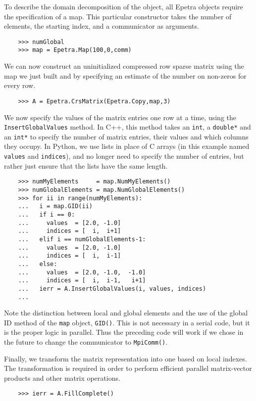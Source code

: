 \documentclass[10pt,relax]{SANDreport}
\begin{document}
To describe the domain decomposition of the object, all Epetra objects
require the specification of a map.  This particular constructor takes
the number of elements, the starting index, and a communicator as
arguments.
\begin{verbatim}
    >>> numGlobal
    >>> map = Epetra.Map(100,0,comm)
\end{verbatim}

We can now construct an uninitialized compressed row sparse matrix
using the map we just built and by specifying an estimate of the
number on non-zeros for every row.
\begin{verbatim}
    >>> A = Epetra.CrsMatrix(Epetra.Copy,map,3)
\end{verbatim}

We now specify the values of the matrix entries one row at a time,
using the {\tt InsertGlobalValues} method.  In C++, this method takes
an {\tt int}, a {\tt double*} and an {\tt int*} to specify the number
of matrix entries, their values and which columns they occupy.  In
Python, we use lists in place of C arrays (in this example named {\tt
  values} and {\tt indices}), and no longer need to specify the number
of entries, but rather just ensure that the lists have the same
length.
\begin{verbatim}
    >>> numMyElements     = map.NumMyElements()
    >>> numGlobalElements = map.NumGlobalElements()
    >>> for ii in range(numMyElements):
    ...   i = map.GID(ii)
    ...   if i == 0:
    ...     values  = [2.0, -1.0]
    ...     indices = [  i,  i+1]
    ...   elif i == numGlobalElements-1:
    ...     values  = [2.0, -1.0]
    ...     indices = [  i,  i-1]
    ...   else:
    ...     values  = [2.0, -1.0,  -1.0]
    ...     indices = [  i,  i-1,   i+1]
    ...   ierr = A.InsertGlobalValues(i, values, indices)
    ...
\end{verbatim}
Note the distinction between local and global elements and the use of
the global ID method of the {\tt map} object, {\tt GID()}.  This is
not necessary in a serial code, but it is the proper logic in
parallel.  Thus the preceding code will work if we chose in the future
to change the communicator to {\tt MpiComm()}.

Finally, we transform the matrix representation into one based on
local indexes. The transformation is required in order to perform
efficient parallel matrix-vector products and other matrix operations.
\begin{verbatim}
    >>> ierr = A.FillComplete()
\end{verbatim}
\end{document}
